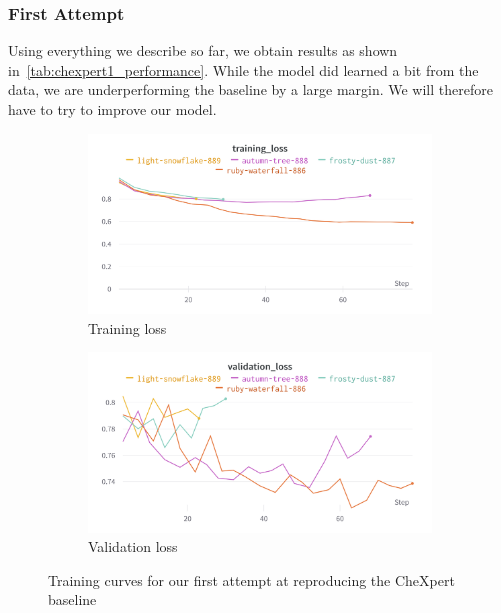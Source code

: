 \documentclass[11pt]{article}
\begin{document}
            \subsubsection{First Attempt}
                Using everything we describe so far, we obtain results as shown in~\ref{tab:chexpert1_performance}.
                While the model did learned a bit from the data, we are underperforming the baseline by a large margin.
                We will therefore have to try to improve our model.



                \begin{figure}[H]
                     \centering
                     \begin{subfigure}[b]{0.45\textwidth}
                         \centering
                         \includegraphics[width=\textwidth]{plots/chexpert_training_loss1}
                         \caption{Training loss}
                         \vspace{4ex}
                         \label{fig:chexpert_training_loss1}
                     \end{subfigure}
                     \hfill
                     \begin{subfigure}[b]{0.45\textwidth}
                         \centering
                         \includegraphics[width=\textwidth]{plots/chexpert_validation_loss1}
                         \caption{Validation loss}
                         \vspace{4ex}
                         \label{fig:chexpert_validation_loss1}
                     \end{subfigure}

                     \caption{Training curves for our first attempt at reproducing the CheXpert baseline}
                \end{figure}
\end{document}
